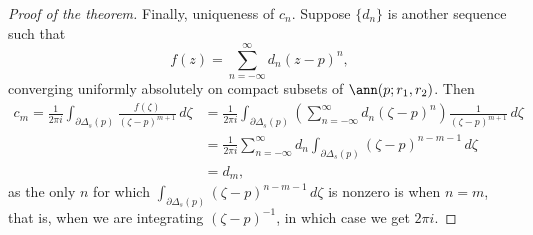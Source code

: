 \begin{proof}[Proof of the theorem]
Finally, uniqueness of $c_n$.  Suppose $\{ d_n \}$ is another sequence such
that
\begin{equation*}
f(z)
=
\sum_{n=-\infty}^{\infty} d_n {(z-p)}^{n} ,
\end{equation*}
converging uniformly absolutely on compact subsets of $\ann(p;r_1,r_2)$.
Then
\begin{equation*}
\begin{split}
c_m = \frac{1}{2\pi i}
\int_{\partial \Delta_{s}(p)} \frac{f(\zeta)}{{(\zeta-p)}^{m+1}}
 \, d\zeta 
& =
\frac{1}{2\pi i}
\int_{\partial \Delta_{s}(p)}
\left(\sum_{n=-\infty}^{\infty} d_n {(\zeta-p)}^{n} \right)
\frac{1}{{(\zeta-p)}^{m+1}}
 \, d\zeta 
\\
& =
\frac{1}{2\pi i}
\sum_{n=-\infty}^{\infty}
d_n
\int_{\partial \Delta_{s}(p)}
{(\zeta-p)}^{n-m-1}
 \, d\zeta 
\\
& =
d_m ,
\end{split}
\end{equation*}
as the only $n$ for which
$\int_{\partial \Delta_{s}(p)}
{(\zeta-p)}^{n-m-1}
 \, d\zeta$ is nonzero is when $n=m$, that is, when we are integrating
${(\zeta-p)}^{-1}$, in which case we get $2 \pi i$.
\end{proof}
